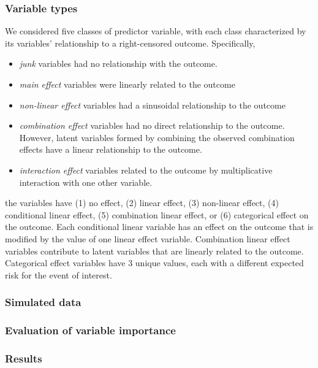 \documentclass[twoside,11pt]{article}\usepackage[]{graphicx}\usepackage[]{xcolor}
\begin{document}
\subsubsection{Variable types}

We considered five classes of predictor variable, with each class characterized by its variables' relationship to a right-censored outcome. Specifically, \begin{itemize}
\item \textit{junk} variables had no relationship with the outcome.
\item \textit{main effect} variables were linearly related to the outcome
\item \textit{non-linear effect} variables had a sinusoidal relationship to the outcome
\item \textit{combination effect} variables had no direct relationship to the outcome. However, latent variables formed by combining the observed combination effects have a linear relationship to the outcome.
\item \textit{interaction effect} variables related to the outcome by multiplicative interaction with one other variable.
\end{itemize}






the variables have (1) no effect, (2) linear effect, (3) non-linear effect, (4) conditional linear effect, (5) combination linear effect, or (6) categorical effect on the outcome. Each conditional linear variable has an effect on the outcome that is modified by the value of one linear effect variable. Combination linear effect variables contribute to latent variables that are linearly related to the outcome. Categorical effect variables have 3 unique values, each with a different expected risk for the event of interest.

\subsubsection{Simulated data}

\subsubsection{Evaluation of variable importance}

\subsubsection{Results}
\end{document}
